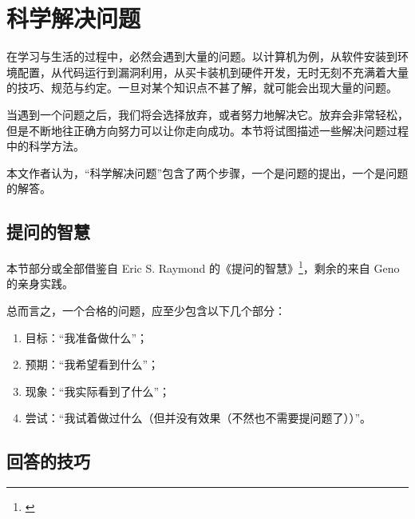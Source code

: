 \section{科学解决问题}\label{sec:solving}
    在学习与生活的过程中，必然会遇到大量的问题。以计算机为例，从软件安装到环境配置，从代码运行到漏洞利用，从买卡装机到硬件开发，无时无刻不充满着大量的技巧、规范与约定。一旦对某个知识点不甚了解，就可能会出现大量的问题。

    当遇到一个问题之后，我们将会选择放弃，或者努力地解决它。放弃会非常轻松，但是不断地往正确方向努力可以让你走向成功。本节将试图描述一些解决问题过程中的科学方法。

    本文作者认为，“科学解决问题”包含了两个步骤，一个是问题的提出，一个是问题的解答。

    \subsection{提问的智慧}\label{subsec:solving/asking}
        本节部分或全部借鉴自 Eric S. Raymond 的《提问的智慧》\footnote{\cite{esr}}，剩余的来自 Geno 的亲身实践。

        总而言之，一个合格的问题，应至少包含以下几个部分：
        \begin{enumerate}
            \item 目标：“我准备做什么”；
            \item 预期：“我希望看到什么”；
            \item 现象：“我实际看到了什么”；
            \item 尝试：“我试着做过什么（但并没有效果（不然也不需要提问题了））”。
        \end{enumerate}

    \subsection{回答的技巧}\label{subsec:solving/answering}
